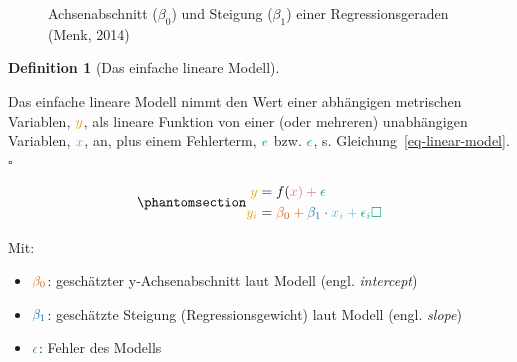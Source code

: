 \documentclass[
  letterpaper,
  oneside,
  open=any]{scrbook}
\providecommand{\tightlist}{%
  \setlength{\itemsep}{0pt}\setlength{\parskip}{0pt}}\usepackage{longtable,booktabs,array}
\theoremstyle{definition}
\theoremstyle{definition}
\theoremstyle{definition}
\newtheorem{definition}{Definition}[chapter]
\theoremstyle{remark}
\begin{document}
\begin{figure}


\caption{\label{fig-regrtex}Achsenabschnitt (\(\beta_0\)) und Steigung
(\(\beta_1\)) einer Regressionsgeraden (Menk, 2014)}

\end{figure}%

\begin{definition}[Das einfache lineare
Modell]\protect\hypertarget{def-einfache-lineare-modell}{}\label{def-einfache-lineare-modell}

Das einfache lineare Modell nimmt den Wert einer abhängigen metrischen
Variablen, \(\color{ycol}{y}\), als lineare Funktion von einer (oder
mehreren) unabhängigen Variablen, \(\color{xcol}{x}\), an, plus einem
Fehlerterm, \(\color{errorcol}{e}\) bzw. \(\color{errorcol}{\epsilon}\),
s. Gleichung~\ref{eq-linear-model}. \(\square\)

\end{definition}

\begin{equation}\phantomsection\label{eq-linear-model}{\begin{aligned}
\color{ycol}{y} &= f(\color{xcol}{x}) + \color{errorcol}{\epsilon} \\
\color{ycol}{y_i} &= \color{beta0col}{\beta_0} + \color{beta1col}{\beta_1} \cdot \color{modelcol}{x_i} + \color{errorcol}{\epsilon_i} \square
\end{aligned}}\end{equation}

Mit:

\begin{itemize}
\tightlist
\item
  \(\color{beta0col}{\beta_0}\): geschätzter y-Achsenabschnitt laut
  Modell (engl. \emph{intercept})
\item
  \(\color{beta1col}{\beta_1}\): geschätzte Steigung
  (Regressionsgewicht) laut Modell (engl. \emph{slope})
\item
  \(\color{errorcol}{\epsilon}\): Fehler des Modells
\end{itemize}
\end{document}
